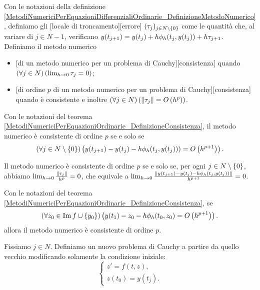 \begin{Definition}
	\label{MetodiNumericiPerEquazioniDifferenzialiOrdinarie_DefinizioneConsistenza}
	Con le notazioni della definizione
\ref{MetodiNumericiPerEquazioniDifferenzialiOrdinarie_DefinizioneMetodoNumerico},
	definiamo gli [locale di troncamento][errore] $(\tau_j)_{j \in N \setminus \lbrace 0 \rbrace}$ come le quantit\`a che, al variare di $j \in N - 1$, verificano $y(t_{j + 1}) = y(t_j) + h \phi_h(t_j,y(t_j)) + h \tau_{j + 1}$.
	Definiamo il metodo numerico
	\begin{itemize}
		\item {}[di un metodo numerico per un problema di Cauchy][consistenza] quando $\left ( \forall j \in N \right ) \left ( \lim_{h \rightarrow 0} \tau_j = 0 \right )$;
		\item {}[di ordine $p$ di un metodo numerico per un problema di Cauchy][consistenza] quando \`e consistente e inoltre $\ForAll{j \in N}{\IsBigO{\Norm{\LocalTruncationError_j}}{\Step^p}}$.
	\end{itemize}
\end{Definition}
\begin{Theorem}
	Con le notazioni del teorema \ref{MetodiNumericiPerEquazioniOrdinarie_DefinizioneConsistenza}, il metodo numerico \`e consistente di ordine $p$ se e solo se
\[
	\left ( \forall j \in N \setminus \lbrace 0 \rbrace \right ) \left ( y(t_{j + 1}) - y(t_j) - h \phi_h(t_j,y(t_j))) = O \left ( h^{p + 1} \right ) \right ).
\]
\end{Theorem}
\Proof Il metodo numerico \`e consistente di ordine $p$ se e solo se, per ogni $j \in N \setminus \lbrace 0 \rbrace$, abbiamo 
$\lim_{\Step \rightarrow 0} \frac{\Norm{\LocalTruncationError_j}}{\Step^p} = 0$, che equivale a
$\lim_{\Step \rightarrow 0} \frac{\Norm{y(t_{j + 1}) - y(t_j) - \Step \phi_\Step(t_j,y(t_j))}}{\Step^{p + 1}} = 0$. \EndProof
\begin{Theorem}
	Con le notazioni del teorema \ref{MetodiNumericiPerEquazioniOrdinarie_DefinizioneConsistenza}, se
\[
	\left ( \forall z_0 \in \operatorname{Im}{f} \cup \lbrace y_0 \rbrace \right ) \left ( y(t_1) - z_0 - h\phi_h(t_0,z_0) = O \left ( h^{p + 1} \right ) \right ).
\]
	allora il metodo numerico \`e consistente di ordine $p$.
\end{Theorem}
\Proof Fissiamo $j \in N$. Definiamo un nuovo problema di Cauchy a partire da quello vecchio modificando solamente la condizione iniziale:
\[
\begin{cases}
	z' = f(t,z),\\
	z(t_0) = y(t_j).
\end{cases}
\]
